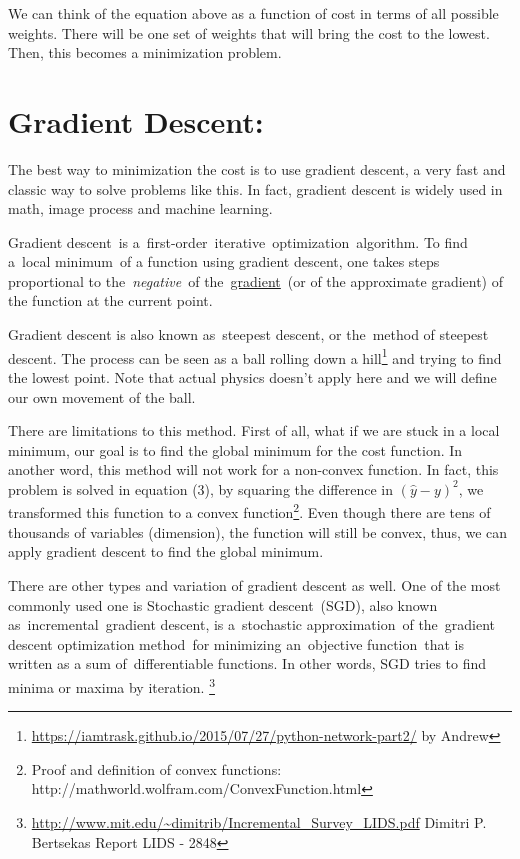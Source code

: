 \documentclass[]{article}
\begin{document}
\begin{multicols}{2}
We can think of the equation above as a function of cost in terms of all
possible weights. There will be one set of weights that will bring the
cost to the lowest. Then, this becomes a minimization problem.

\section{Gradient Descent:}

The best way to minimization the cost is to use gradient descent, a very
fast and classic way to solve problems like this. In fact, gradient
descent is widely used in math, image process and machine learning.

Gradient descent~is a~first-order~iterative~optimization~algorithm. To
find a~local minimum~of a function using gradient descent, one takes
steps proportional to the~\emph{negative}~of
the~\href{https://en.wikipedia.org/wiki/Gradient}{gradient}~(or of the
approximate gradient) of the function at the current point.

Gradient descent is also known as~steepest descent, or the~method of
steepest descent. The process can be seen as a ball rolling down a
hill\footnote{\url{https://iamtrask.github.io/2015/07/27/python-network-part2/}
  by Andrew}
and trying to find the lowest point. Note that actual physics doesn't
apply here and we will define our own movement of the ball.

There are limitations to this method. First of all, what if we are stuck
in a local minimum, our goal is to find the global minimum for the cost
function. In another word, this method will not work for a non-convex
function. In fact, this problem is solved in equation (3), by squaring
the difference in \({(\hat{y} - y)}^{2}\), we transformed this function
to a convex function\footnote{Proof and definition of convex functions:
  http://mathworld.wolfram.com/ConvexFunction.html}. Even though there
are tens of thousands of variables (dimension), the function will still
be convex, thus, we can apply gradient descent to find the global
minimum.

There are other types and variation of gradient descent as well. One of
the most commonly used one is Stochastic gradient descent~(SGD), also
known as~incremental~gradient descent, is a~stochastic approximation~of
the~gradient descent optimization method~for minimizing an~objective
function~that is written as a sum of~differentiable functions. In other
words, SGD tries to find minima or maxima by iteration. \footnote{\url{http://www.mit.edu/~dimitrib/Incremental_Survey_LIDS.pdf}
  Dimitri P. Bertsekas Report LIDS - 2848}


\end{multicols}
\end{document}
